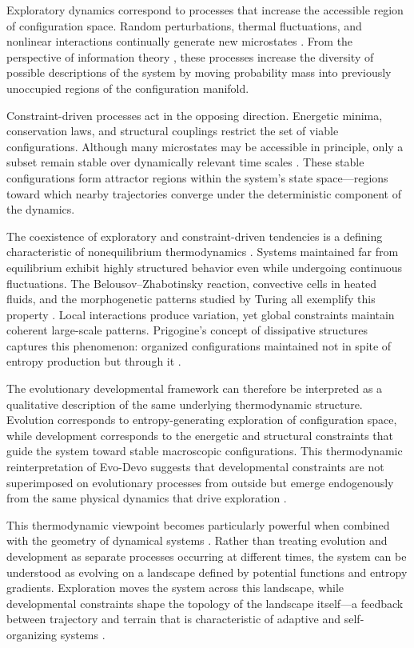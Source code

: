 \documentclass[12pt]{article}
\begin{document}
Exploratory dynamics correspond to processes that increase the accessible region of configuration space. Random perturbations, thermal fluctuations, and nonlinear interactions continually generate new microstates \cite{nicolis1977,strogatz1994}. From the perspective of information theory \cite{cover2006}, these processes increase the diversity of possible descriptions of the system by moving probability mass into previously unoccupied regions of the configuration manifold.

Constraint-driven processes act in the opposing direction. Energetic minima, conservation laws, and structural couplings restrict the set of viable configurations. Although many microstates may be accessible in principle, only a subset remain stable over dynamically relevant time scales \cite{strogatz1994,nicolis1977}. These stable configurations form attractor regions within the system's state space---regions toward which nearby trajectories converge under the deterministic component of the dynamics.

The coexistence of exploratory and constraint-driven tendencies is a defining characteristic of nonequilibrium thermodynamics \cite{prigogine1984,nicolis1977}. Systems maintained far from equilibrium exhibit highly structured behavior even while undergoing continuous fluctuations. The Belousov--Zhabotinsky reaction, convective cells in heated fluids, and the morphogenetic patterns studied by Turing all exemplify this property \cite{nicolis1977,haken1983}. Local interactions produce variation, yet global constraints maintain coherent large-scale patterns. Prigogine's concept of dissipative structures captures this phenomenon: organized configurations maintained not in spite of entropy production but through it \cite{prigogine1984}.

The evolutionary developmental framework can therefore be interpreted as a qualitative description of the same underlying thermodynamic structure. Evolution corresponds to entropy-generating exploration of configuration space, while development corresponds to the energetic and structural constraints that guide the system toward stable macroscopic configurations. This thermodynamic reinterpretation of Evo-Devo suggests that developmental constraints are not superimposed on evolutionary processes from outside but emerge endogenously from the same physical dynamics that drive exploration \cite{kauffman1993,prigogine1984}.

This thermodynamic viewpoint becomes particularly powerful when combined with the geometry of dynamical systems \cite{strogatz1994}. Rather than treating evolution and development as separate processes occurring at different times, the system can be understood as evolving on a landscape defined by potential functions and entropy gradients. Exploration moves the system across this landscape, while developmental constraints shape the topology of the landscape itself---a feedback between trajectory and terrain that is characteristic of adaptive and self-organizing systems \cite{bak1996,langton1990}.
\end{document}
